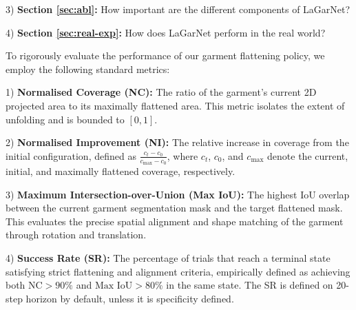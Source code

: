 \documentclass[journal]{IEEEtran}
\newcommand{\addinfo}[1]{\textcolor{myPurple}{#1}}
\newcommand{\addIncrementalg}[1]{\textcolor{mygreen}{#1}}
\begin{document}
\addIncrementalg{3) \textbf{Section \ref{sec:abl}:} How important are the different components of LaGarNet?} 

\addIncrementalg{4) \textbf{Section \ref{sec:real-exp}:} How does LaGarNet perform in the real world?}    


\addinfo{To rigorously evaluate the performance of our garment flattening policy, we employ the following standard metrics:}

\addinfo{1) \textbf{Normalised Coverage (NC):} The ratio of the garment's current 2D projected area to its maximally flattened area. This metric isolates the extent of unfolding and is bounded to $[0, 1]$.}

\addinfo{2) \textbf{Normalised Improvement (NI):} The relative increase in coverage from the initial configuration, defined as $\frac{c_t - c_0}{c_{\text{max}} - c_0}$, where $c_t$, $c_0$, and $c_{\text{max}}$ denote the current, initial, and maximally flattened coverage, respectively. }

\addinfo{3) \textbf{Maximum Intersection-over-Union (Max IoU):} The highest IoU overlap between the current garment segmentation mask and the target flattened mask. This evaluates the precise spatial alignment and shape matching of the garment through rotation and translation.}

\addinfo{4) \textbf{Success Rate (SR):} The percentage of trials that reach a terminal state satisfying strict flattening and alignment criteria, empirically defined as achieving both $\text{NC} > 90\%$ and $\text{Max IoU} > 80\%$ in the same state. The SR is defined on 20-step horizon by default, unless it is specificity defined.}
\end{document}
